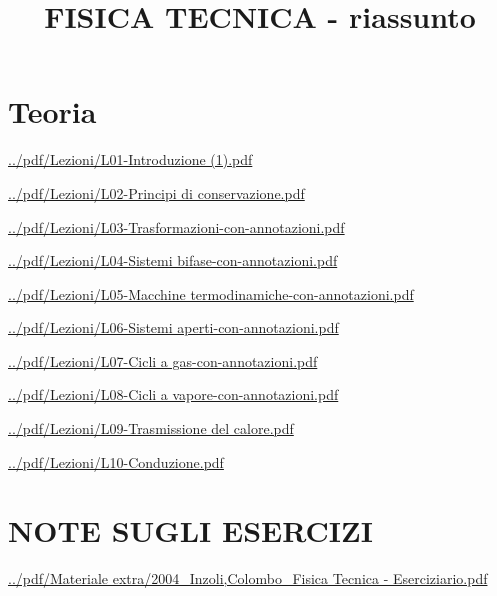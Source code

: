\documentclass[a4paper, 9pt]{article}
\title{FISICA TECNICA - riassunto}
\begin{document}
    \maketitle
    \tableofcontents{}
    \newpage
    \part{Teoria}
    \newpage
    \url{../pdf/Lezioni/L01-Introduzione (1).pdf}
    
    \newpage
    \url{../pdf/Lezioni/L02-Principi di conservazione.pdf}
    
    \newpage
    \url{../pdf/Lezioni/L03-Trasformazioni-con-annotazioni.pdf}
    
    \newpage
    \url{../pdf/Lezioni/L04-Sistemi bifase-con-annotazioni.pdf}
    
    \newpage
    \url{../pdf/Lezioni/L05-Macchine termodinamiche-con-annotazioni.pdf}
    
    \newpage
    \url{../pdf/Lezioni/L06-Sistemi aperti-con-annotazioni.pdf}
    
    \newpage
    \url{../pdf/Lezioni/L07-Cicli a gas-con-annotazioni.pdf}
    
    \newpage
    \url{../pdf/Lezioni/L08-Cicli a vapore-con-annotazioni.pdf}
    
    \newpage
    \url{../pdf/Lezioni/L09-Trasmissione del calore.pdf}
    
    \newpage
    \url{../pdf/Lezioni/L10-Conduzione.pdf}
    
    \newpage
    \part{NOTE SUGLI ESERCIZI}
    \newpage
    \url{../pdf/Materiale extra/2004_Inzoli,Colombo_Fisica Tecnica - Eserciziario.pdf}
    
\end{document}
